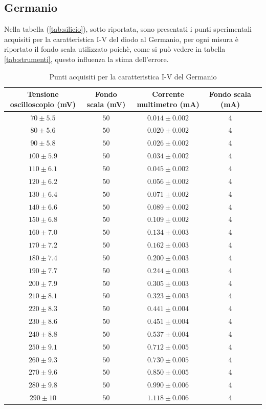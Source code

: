 \documentclass[]{article}
\begin{document}
\subsection{Germanio}
Nella tabella (\ref{tab:silicio}), sotto riportata, sono presentati i punti sperimentali acquisiti per la caratteristica I-V del diodo al Germanio, per ogni misura è riportato il fondo scala utilizzato poichè, come si può vedere in tabella \ref{tab:strumenti}, questo influenza la stima dell'errore.
	\begin{table}[H]
		\centering
	\begin{tabular}{|c|c|c|c|c|}
		\hline
		Tensione oscilloscopio (mV)& Fondo scala (mV) & Corrente multimetro (mA) &Fondo scala (mA)\\
		\hline
		$ 70\pm 5.5 $ &$ 50 $ & $ 0.014\pm 0.002 $ &4 \\
		\hline
		$ 80\pm 5.6$ &$ 50 $ & $ 0.020\pm 0.002 $&4 \\
		\hline
		$ 90\pm 5.8$ &$ 50 $ & $ 0.026\pm 0.002 $&4 \\
		\hline
		$ 100\pm 5.9 $ &$ 50 $ & $ 0.034\pm 0.002 $&4 \\
		\hline
		$110\pm 6.1 $ &$ 50 $ & $ 0.045\pm 0.002 $&4 \\
		\hline
		$ 120\pm 6.2 $ &$ 50 $ & $ 0.056\pm 0.002 $&4 \\
		\hline
		$ 130\pm 6.4$ &$ 50 $ & $ 0.071\pm 0.002 $&4 \\
		\hline
		$ 140\pm 6.6$ &$ 50 $ & $ 0.089\pm 0.002 $&4 \\
		\hline
		$ 150\pm 6.8$ &$ 50 $ & $ 0.109\pm 0.002 $&4 \\
		\hline
		$ 160\pm 7.0$ &$ 50 $ & $ 0.134\pm 0.003 $&4 \\
		\hline
		$ 170\pm 7.2$ &$ 50 $ & $ 0.162\pm 0.003 $&4 \\
		\hline
		$ 180\pm 7.4$ &$ 50 $ & $ 0.200\pm 0.003 $&4 \\
		\hline
		$ 190\pm 7.7$ &$ 50 $ & $ 0.244\pm 0.003 $&4 \\
		\hline
		$ 200\pm 7.9$ &$ 50 $ & $ 0.305\pm 0.003 $&4 \\
		\hline
		$ 210\pm 8.1$ &$ 50 $ & $ 0.323\pm 0.003 $&4 \\
		\hline
		$ 220\pm 8.3$ &$ 50 $ & $ 0.441\pm 0.004 $&4 \\
		\hline
		$ 230\pm 8.6$ &$ 50 $ & $ 0.451\pm 0.004 $&4 \\
		\hline
		$ 240\pm 8.8$ &$ 50 $ & $ 0.537\pm 0.004 $&4 \\
		\hline
		$ 250\pm 9.1$ &$ 50 $ & $ 0.712\pm 0.005 $&4 \\
		\hline
		$ 260\pm 9.3$ &$ 50 $ & $ 0.730\pm 0.005 $&4 \\
		\hline
		$ 270\pm 9.6$ &$ 50 $ & $ 0.850\pm 0.005 $&4 \\
		\hline
		$ 280\pm 9.8$ &$ 50 $ & $ 0.990\pm 0.006 $&4 \\
		\hline
		$ 290\pm 10$ &$ 50 $ & $ 1.118\pm 0.006 $&4 \\
		\hline
	\end{tabular}
\caption{Punti acquisiti per la caratteristica I-V del Germanio}
\label{tab:germanio}
\end{table}
\end{document}
